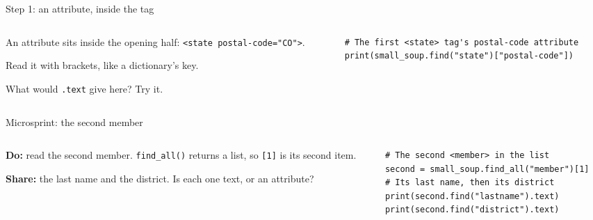 \documentclass[9pt,aspectratio=169]{beamer}
\begin{document}
\begin{frame}[fragile]{Step 1: an attribute, inside the tag}
    \begin{columns}[T]
        \begin{column}{0.37\textwidth}
            An attribute sits inside the opening half: \texttt{<state postal-code="CO">}.

            \medskip
            Read it with brackets, like a dictionary's key.

            \medskip
            What would \texttt{.text} give here? Try it.
        \end{column}
        \begin{column}{0.6\textwidth}
\begin{lstlisting}
# The first <state> tag's postal-code attribute
print(small_soup.find("state")["postal-code"])
\end{lstlisting}
        \end{column}
    \end{columns}
\end{frame}

\begin{frame}[fragile]{Microsprint: the second member}
    \begin{columns}[T]
        \begin{column}{0.37\textwidth}
            \textbf{Do:} read the second member. \texttt{find\_all()} returns a list, so \texttt{[1]} is its second item.

            \medskip
            \textbf{Share:} the last name and the district. Is each one text, or an attribute?
        \end{column}
        \begin{column}{0.6\textwidth}
\begin{lstlisting}
# The second <member> in the list
second = small_soup.find_all("member")[1]
# Its last name, then its district
print(second.find("lastname").text)
print(second.find("district").text)
\end{lstlisting}
        \end{column}
    \end{columns}
\end{frame}
\end{document}
